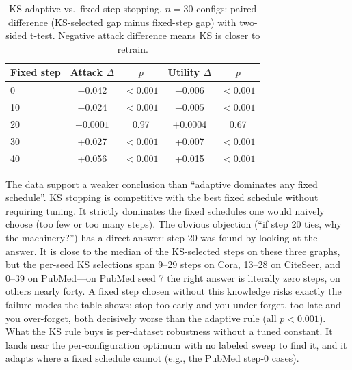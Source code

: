 \documentclass[pdflatex,sn-basic,Numbered]{sn-jnl}
\begin{document}
\begin{table}[htbp]\centering\small
\caption{KS-adaptive vs.\ fixed-step stopping, $n = 30$ configs: paired difference (KS-selected gap minus fixed-step gap) with two-sided t-test. Negative attack difference means KS is closer to retrain.}
\begin{tabular}{lcccc}\toprule Fixed step & Attack $\Delta$ & $p$ & Utility $\Delta$ & $p$\\\midrule
0 & $-0.042$ & $< 0.001$ & $-0.006$ & $< 0.001$\\
10 & $-0.024$ & $< 0.001$ & $-0.005$ & $< 0.001$\\
20 & $-0.0001$ & 0.97 & +0.0004 & 0.67\\
30 & +0.027 & $< 0.001$ & +0.007 & $< 0.001$\\
40 & +0.056 & $< 0.001$ & +0.015 & $< 0.001$\\\bottomrule
\end{tabular}\end{table}

The data support a weaker conclusion than ``adaptive dominates any fixed schedule''. KS stopping is competitive with the best fixed schedule without requiring tuning. It strictly dominates the fixed schedules one would naively choose (too few or too many steps). The obvious objection (``if step 20 ties, why the machinery?'') has a direct answer: step 20 was found by looking at the answer. It is close to the median of the KS-selected steps on these three graphs, but the per-seed KS selections span 9--29 steps on Cora, 13--28 on CiteSeer, and 0--39 on PubMed---on PubMed seed 7 the right answer is literally zero steps, on others nearly forty. A fixed step chosen without this knowledge risks exactly the failure modes the table shows: stop too early and you under-forget, too late and you over-forget, both decisively worse than the adaptive rule (all $p < 0.001$). What the KS rule buys is per-dataset robustness without a tuned constant. It lands near the per-configuration optimum with no labeled sweep to find it, and it adapts where a fixed schedule cannot (e.g., the PubMed step-0 cases).
\end{document}
